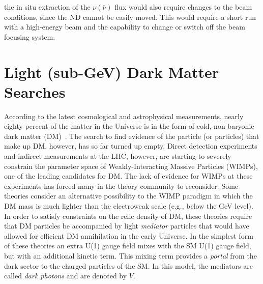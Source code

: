 the in situ extraction of the $\nu(\overline{\nu})$ flux would
also require changes to the beam conditions, since the ND cannot be
easily moved. This would require a short run with a high-energy beam
and the capability to change or switch off the beam focusing system.
\section{Light (sub-GeV) Dark Matter Searches}
According to the latest cosmological and astrophysical measurements,
nearly eighty percent of the matter in the Universe is in the form of
cold, non-baryonic dark matter (DM)~\cite{Ade:2013zuv,Bennett:2012zja}. 
The search to find evidence of the particle (or particles) that make
up DM, however, has so far turned up empty.  Direct detection
experiments and indirect measurements at the LHC, however, are
starting to severely constrain the parameter space of
Weakly-Interacting Massive Particles (WIMPs), one of the leading
candidates for DM.  The lack of evidence for WIMPs at these
experiments has forced many in the theory community to
reconsider.%
Some theories consider an alternative possibility to the WIMP paradigm
in which the DM mass is much lighter than the electroweak scale (e.g.,
below the GeV level). In order to satisfy constraints on the relic
density of DM, these theories require that DM particles be accompanied
by light \emph{mediator} particles that would have allowed for efficient
DM annihilation in the early Universe. In the simplest form of these
theories an extra U(1) gauge field mixes with the SM
U(1) gauge field, but with an additional kinetic term.  This mixing
term provides a \emph{portal} from the dark sector to the charged
particles of the SM.  In this model, the mediators are called \emph{dark
photons} and are denoted by $V$.

